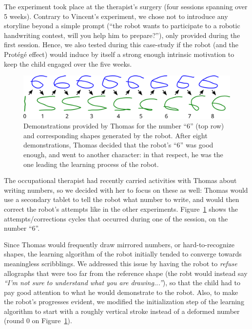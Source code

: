 \documentclass{article}
\begin{document}
The experiment took place at the therapist's surgery (four sessions spanning
over 5 weeks). Contrary to Vincent's experiment, we chose not to introduce any
storyline beyond a simple prompt (``the robot wants to participate to a robotic
handwriting contest, will you help him to prepare?''), only provided during the
first session. Hence, we also tested during this case-study if the robot (and
the Protégé effect) would induce by itself a strong enough intrinsic motivation to
keep the child engaged over the five weeks.

\begin{figure}
    \centering
    \includegraphics[width=0.9\linewidth]{learning_6_demos}
    \caption{\small Demonstrations provided by Thomas for the number ``6'' (top row) and
        corresponding shapes generated by the robot. After eight demonstrations,
        Thomas decided that the robot's ``6'' was good enough, and went to
    another character: in that respect, he was the one leading the learning
process of the robot.}
    \label{learning_6_demos}
\end{figure}


The occupational therapist had recently carried activities with Thomas about
writing numbers, so we decided with her to focus on these as well: Thomas would
use a secondary tablet to tell the robot what number to write, and would then
correct the robot's attempts like in the other experiments.
Figure~\ref{learning_6_demos} shows the attempts/corrections cycles that
occurred during one of the session, on the number ``6''.


Since Thomas would frequently draw mirrored numbers, or hard-to-recognize
shapes, the learning algorithm of the robot initially tended to converge towards
meaningless scribblings. We addressed this issue by having the robot to
\emph{refuse} allographs that were too far from the reference shape (the robt
would instead say \emph{``I'm
not sure to understand what you are drawing...''}), so that the child had to
pay good attention to what he would demonstrate to the robot. Also, to make
the robot's progresses evident, we modified the initialization step of the
learning algorithm to start with a roughly vertical stroke instead of a
deformed number (round 0 on Figure~\ref{learning_6_demos}).
\end{document}
